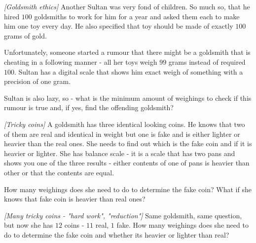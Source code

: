 

%


\noindent 

\begin{problem}
\textit{[Goldsmith ethics]}
Another Sultan was very fond of children. So much so, that he hired $100$ goldsmiths to work for him for a year and asked them each to make him one toy every day. He also specified that toy should be made of exactly $100$ grams of gold.

Unfortunately, someone started a rumour that there might be a goldsmith that is cheating in a following manner - all her toys weigh $99$ grams instead of required $100$. Sultan has a digital scale that shows him exact weigh of something with a precision of one gram. 

Sultan is also lazy, so - what is the minimum amount of weighings to check if this rumour is true and, if yes, find the offending goldsmith?
\end{problem}
%

\begin{problem}
\textit{[Tricky coins]}
A goldsmith has three identical looking coins. He knows that two of them are real and identical in weight but one is fake and is either lighter or heavier than the real ones. She needs to find out which is the fake coin and if it is heavier or lighter.
She has balance scale - it is a scale that has two pans and shows you one of the three results - either contents of one of pans is heavier than other or that the contents are equal.

How many weighings does she need to do to determine the fake coin? What if she knows that fake coin is heavier than real ones?
\end{problem}
%

\begin{problem}
\textit{[Many tricky coins - "hard work", "reduction"]}
Same goldsmith, same question, but now she has $12$ coins - $11$ real, $1$ fake.
How many weighings does she need to do to determine the fake coin and whether its heavier or lighter than real? 
\end{problem}
%


